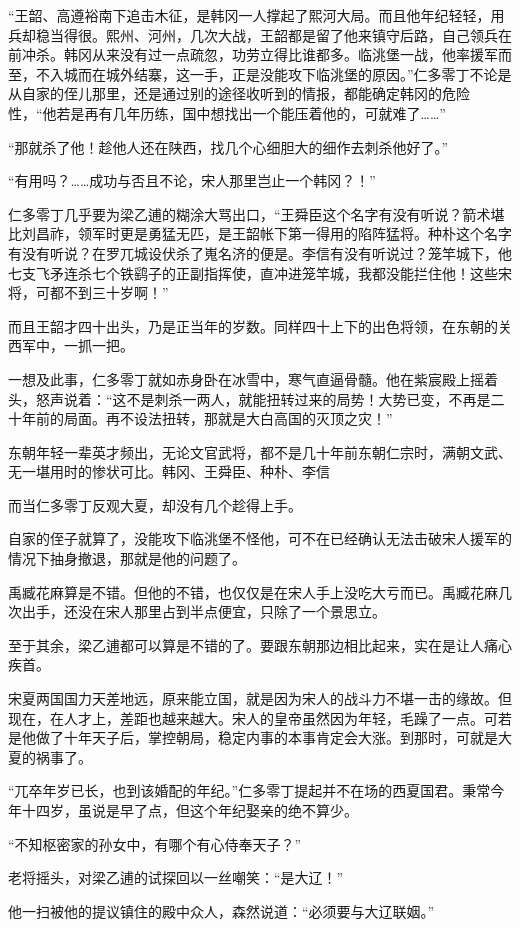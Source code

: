“王韶、高遵裕南下追击木征，是韩冈一人撑起了熙河大局。而且他年纪轻轻，用兵却稳当得很。熙州、河州，几次大战，王韶都是留了他来镇守后路，自己领兵在前冲杀。韩冈从来没有过一点疏忽，功劳立得比谁都多。临洮堡一战，他率援军而至，不入城而在城外结寨，这一手，正是没能攻下临洮堡的原因。”仁多零丁不论是从自家的侄儿那里，还是通过别的途径收听到的情报，都能确定韩冈的危险性，“他若是再有几年历练，国中想找出一个能压着他的，可就难了……”

“那就杀了他！趁他人还在陕西，找几个心细胆大的细作去刺杀他好了。”

“有用吗？……成功与否且不论，宋人那里岂止一个韩冈？！”

仁多零丁几乎要为梁乙逋的糊涂大骂出口，“王舜臣这个名字有没有听说？箭术堪比刘昌祚，领军时更是勇猛无匹，是王韶帐下第一得用的陷阵猛将。种朴这个名字有没有听说？在罗兀城设伏杀了嵬名济的便是。李信有没有听说过？笼竿城下，他七支飞矛连杀七个铁鹞子的正副指挥使，直冲进笼竿城，我都没能拦住他！这些宋将，可都不到三十岁啊！”

而且王韶才四十出头，乃是正当年的岁数。同样四十上下的出色将领，在东朝的关西军中，一抓一把。

一想及此事，仁多零丁就如赤身卧在冰雪中，寒气直逼骨髓。他在紫宸殿上摇着头，怒声说着：“这不是刺杀一两人，就能扭转过来的局势！大势已变，不再是二十年前的局面。再不设法扭转，那就是大白高国的灭顶之灾！”

东朝年轻一辈英才频出，无论文官武将，都不是几十年前东朝仁宗时，满朝文武、无一堪用时的惨状可比。韩冈、王舜臣、种朴、李信

而当仁多零丁反观大夏，却没有几个趁得上手。

自家的侄子就算了，没能攻下临洮堡不怪他，可不在已经确认无法击破宋人援军的情况下抽身撤退，那就是他的问题了。

禹臧花麻算是不错。但他的不错，也仅仅是在宋人手上没吃大亏而已。禹臧花麻几次出手，还没在宋人那里占到半点便宜，只除了一个景思立。

至于其余，梁乙逋都可以算是不错的了。要跟东朝那边相比起来，实在是让人痛心疾首。

宋夏两国国力天差地远，原来能立国，就是因为宋人的战斗力不堪一击的缘故。但现在，在人才上，差距也越来越大。宋人的皇帝虽然因为年轻，毛躁了一点。可若是他做了十年天子后，掌控朝局，稳定内事的本事肯定会大涨。到那时，可就是大夏的祸事了。

“兀卒年岁已长，也到该婚配的年纪。”仁多零丁提起并不在场的西夏国君。秉常今年十四岁，虽说是早了点，但这个年纪娶亲的绝不算少。

“不知枢密家的孙女中，有哪个有心侍奉天子？”

老将摇头，对梁乙逋的试探回以一丝嘲笑：“是大辽！”

他一扫被他的提议镇住的殿中众人，森然说道：“必须要与大辽联姻。”

